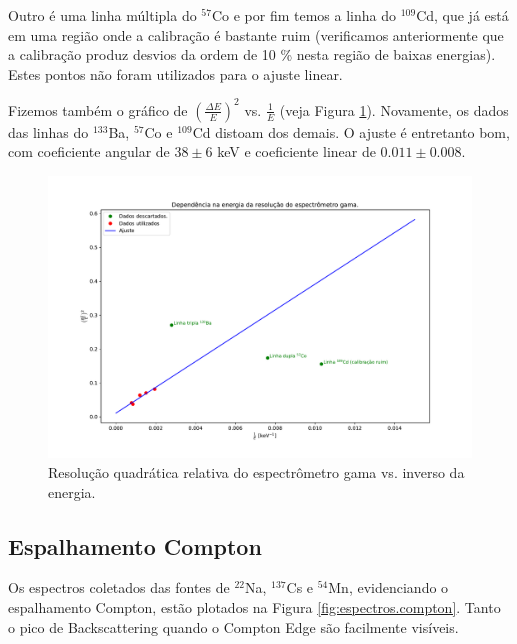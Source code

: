\documentclass[a4paper, 11pt, notitlepage]{article}
\numberwithin{equation}{section}  %
\begin{document}
Outro é uma linha múltipla do ${}^{57}$Co e por fim temos a linha do ${}^{109}$Cd, que já está em uma região onde a calibração é bastante ruim (verificamos anteriormente que a calibração produz desvios da ordem de 10 \% nesta região de baixas energias). Estes pontos não foram utilizados para o ajuste linear.

Fizemos também o gráfico de $\left(\frac{\Delta E}{E}\right)^2$ vs. $\frac{1}{E}$ (veja Figura \ref{fig:resolucao.lin}). Novamente, os dados das linhas do ${}^{133}$Ba, ${}^{57}$Co e ${}^{109}$Cd distoam dos demais. O ajuste é entretanto bom, com coeficiente angular de $38 \pm 6$ keV e coeficiente linear de $0.011 \pm 0.008$.

\begin{figure}[H]
  \centering
  \includegraphics[width=1.0\textwidth]{resolucao_lin.pdf}
  \caption{Resolução quadrática relativa do espectrômetro gama vs. inverso da energia.}
  \label{fig:resolucao.lin}
\end{figure}

\subsection{Espalhamento Compton}

Os espectros coletados das fontes de ${}^{22}$Na, ${}^{137}$Cs e ${}^{54}$Mn, evidenciando o espalhamento Compton, estão plotados na Figura \ref{fig:espectros.compton}. Tanto o pico de Backscattering quando o Compton Edge são facilmente visíveis.
\end{document}
